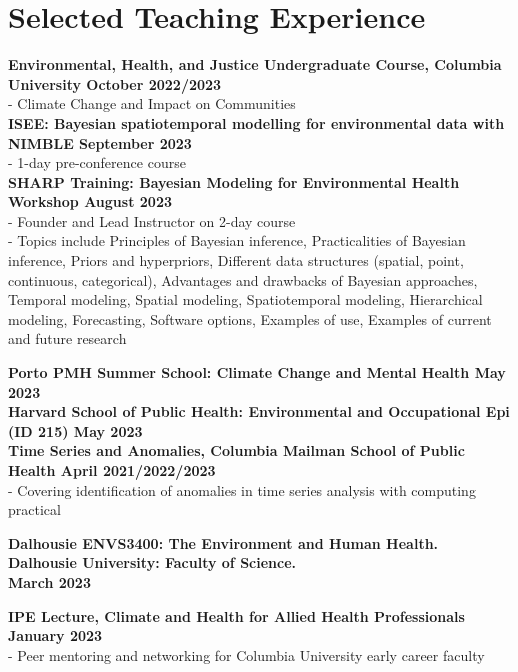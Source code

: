 \section*{Selected Teaching Experience}

\noindent \textbf{Environmental, Health, and Justice Undergraduate Course, Columbia University \hfill October 2022/2023}\\
\noindent - Climate Change and Impact on Communities\\

\noindent \textbf{ISEE: Bayesian spatiotemporal modelling for environmental data with NIMBLE \hfill September 2023}\\
\noindent - 1-day pre-conference course\\

\noindent \textbf{SHARP Training: Bayesian Modeling for Environmental Health Workshop \hfill August 2023}\\
\noindent - Founder and Lead Instructor on 2-day course \\
\noindent - Topics include Principles of Bayesian inference, Practicalities of Bayesian inference, Priors and hyperpriors, Different data structures (spatial, point, continuous, categorical), Advantages and drawbacks of Bayesian approaches, Temporal modeling, Spatial modeling, Spatiotemporal modeling, Hierarchical modeling, Forecasting, Software options, Examples of use, Examples of current and future research \bigskip

\noindent \textbf{Porto PMH Summer School: Climate Change and Mental Health \hfill May 2023}\\

\noindent \textbf{Harvard School of Public Health: Environmental and Occupational Epi (ID 215) \hfill May 2023}\\

\noindent \textbf{Time Series and Anomalies, Columbia Mailman School of Public Health \hfill April 2021/2022/2023}\\
\noindent - Covering identification of anomalies in time series analysis with computing practical
\bigskip

\noindent \textbf {Dalhousie ENVS3400: The Environment and Human Health. Dalhousie University: Faculty of Science.\\ \hfill March 2023}
\bigskip

\noindent \textbf{IPE Lecture, Climate and Health for Allied Health Professionals \hfill January 2023}\\
\noindent - Peer mentoring and networking for Columbia University early career faculty
\bigskip

